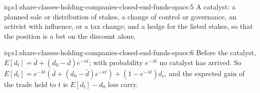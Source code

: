 \begin{solution}{iq:s1:share-classes-holding-companies-closed-end-funds-spacs:5}
A catalyst: a planned sale or distribution of stakes, a change of control or governance, an activist with influence, or a tax change; and a hedge for the
listed stakes, so that the position is a bet on the discount alone.
\end{solution}

\begin{solution}{iq:s1:share-classes-holding-companies-closed-end-funds-spacs:6}
Before the catalyst, $E[d_t] = \bar d + (d_0 - \bar d)e^{-\kappa t}$; with probability $e^{-\lambda t}$ no catalyst has arrived. So $E[d_t] = e^{-\lambda t}(\bar d +
(d_0 - \bar d)e^{-\kappa t}) + (1 - e^{-\lambda t})d_c$, and the expected gain of the trade held to $t$ is $E[d_t] - d_0$ less carry.
\end{solution}
